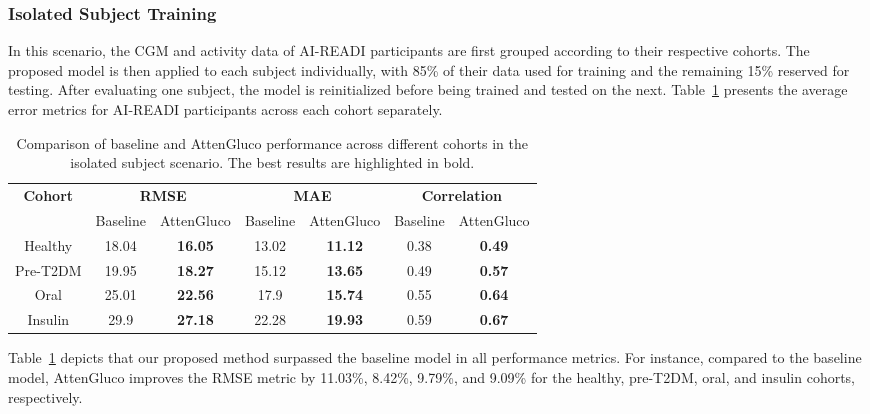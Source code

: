 \subsubsection{Isolated Subject Training}
In this scenario, the CGM and activity data of AI-READI participants are first grouped according to their respective cohorts. The proposed model is then applied to each subject individually, with 85\% of their data used for training and the remaining 15\% reserved for testing. After evaluating one subject, the model is reinitialized before being trained and tested on the next. Table~\ref{tab:performance Person} presents the average error metrics for AI-READI participants across each cohort separately.
\vspace{-2mm}
\begin{table}[h]
\captionsetup{font=small} %
\caption{Comparison of baseline and AttenGluco performance across different cohorts in the isolated subject scenario. The best results are highlighted in bold.}
    \centering
    \renewcommand{\arraystretch}{1} %
    \setlength{\tabcolsep}{2pt} %
    \begin{adjustbox}{max width=\columnwidth}
    \begin{tabular}{|c|cc|cc|cc|}
        \hline
        \multirow{2}{*}{\textbf{Cohort}} & \multicolumn{2}{c|}{\textbf{RMSE}} & \multicolumn{2}{c|}{\textbf{MAE}} & \multicolumn{2}{c|}{\textbf{Correlation}} \\
        & Baseline & AttenGluco & Baseline & AttenGluco & Baseline & AttenGluco \\
        \hline
        Healthy     & 18.04 & \textbf{16.05} & 13.02  & \textbf{11.12} & 0.38 & \textbf{0.49} \\
        Pre-T2DM & 19.95 & \textbf{18.27} & 15.12  & \textbf{13.65} & 0.49 & \textbf{0.57} \\
        Oral        & 25.01  & \textbf{22.56} & 17.9   & \textbf{15.74} & 0.55 & \textbf{0.64} \\
        Insulin      & 29.9  & \textbf{27.18} & 22.28  & \textbf{19.93} & 0.59 & \textbf{0.67} \\
        \hline
    \end{tabular}
    \label{tab:performance Person}
    \end{adjustbox}
\end{table}

Table~\ref{tab:performance Person} depicts that our proposed method surpassed the baseline model in all performance metrics. For instance, compared to the baseline model, AttenGluco improves the RMSE metric by 11.03\%, 8.42\%, 9.79\%, and 9.09\% for the healthy, pre-T2DM, oral, and insulin cohorts, respectively.
